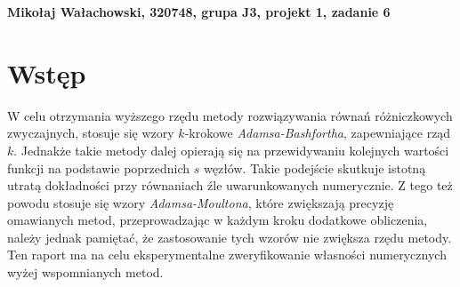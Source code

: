 \documentclass[a4paper,12pt]{article}
\begin{document}
\def\tablename{Tabela} %


\noindent
\textbf{Mikołaj Wałachowski, 320748, grupa J3, projekt 1, zadanie 6}


\section*{Wstęp} %
W celu otrzymania wyższego rzędu metody rozwiązywania równań różniczkowych zwyczajnych, stosuje się wzory $k$-krokowe \textit{Adamsa-Bashfortha}, zapewniające rząd $k$. Jednakże takie metody dalej opierają się na przewidywaniu kolejnych wartości funkcji na podstawie poprzednich $s$ węzłów. Takie podejście skutkuje istotną utratą dokładności przy równaniach źle uwarunkowanych numerycznie. Z tego też powodu stosuje się wzory \textit{Adamsa-Moultona}, które zwiększają precyzję omawianych metod, przeprowadzając w każdym kroku dodatkowe obliczenia, należy jednak pamiętać, że zastosowanie tych wzorów nie zwiększa rzędu metody. Ten raport ma na celu eksperymentalne zweryfikowanie własności numerycznych wyżej wspomnianych metod.
\end{document}
